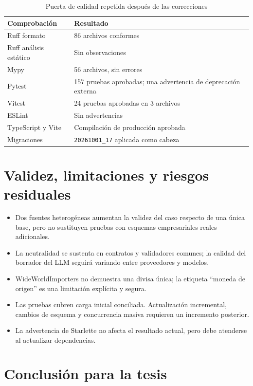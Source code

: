 \documentclass[11pt,letterpaper]{article}
\newcommand{\file}[1]{\texttt{#1}}
\begin{document}
\begin{table}[H]
\centering
\caption{Puerta de calidad repetida después de las correcciones}
\begin{tabularx}{\textwidth}{@{}p{}X@{}}
\toprule
Comprobación & Resultado \\
\midrule
Ruff formato & 86 archivos conformes \\
Ruff análisis estático & Sin observaciones \\
Mypy & 56 archivos, sin errores \\
Pytest & 157 pruebas aprobadas; una advertencia de deprecación externa \\
Vitest & 24 pruebas aprobadas en 3 archivos \\
ESLint & Sin advertencias \\
TypeScript y Vite & Compilación de producción aprobada \\
Migraciones & \file{20261001\_17} aplicada como cabeza \\
\bottomrule
\end{tabularx}
\end{table}

\section{Validez, limitaciones y riesgos residuales}

\begin{itemize}
  \item Dos fuentes heterogéneas aumentan la validez del caso respecto de una única base,
  pero no sustituyen pruebas con esquemas empresariales reales adicionales.
  \item La neutralidad se sustenta en contratos y validadores comunes; la calidad del
  borrador del LLM seguirá variando entre proveedores y modelos.
  \item WideWorldImporters no demuestra una divisa única; la etiqueta ``moneda de origen''
  es una limitación explícita y segura.
  \item Las pruebas cubren carga inicial conciliada. Actualización incremental, cambios de
  esquema y concurrencia masiva requieren un incremento posterior.
  \item La advertencia de Starlette no afecta el resultado actual, pero debe atenderse al
  actualizar dependencias.
\end{itemize}

\section{Conclusión para la tesis}
\end{document}
